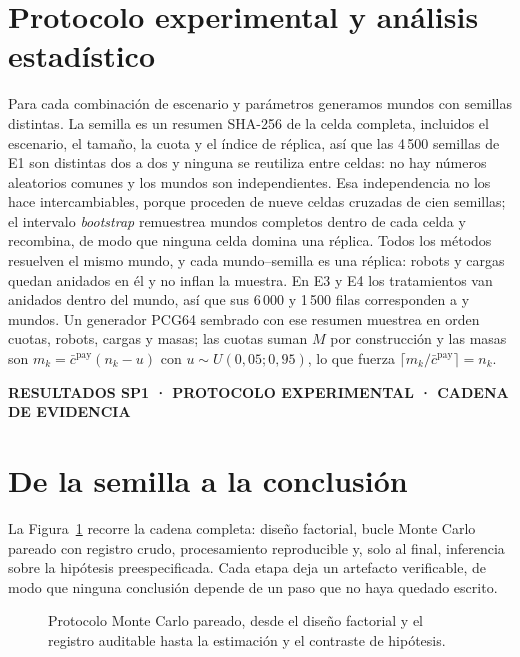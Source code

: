 \documentclass[12pt,a4paper]{article}
\renewcommand{\viuownsource}{%
  \par\vspace{0.8mm}\noindent
  \makebox[\linewidth][c]{\footnotesize\itshape Elaboración propia.}%
  \par
}
\newcommand{\leveltag}[1]{%
  \noindent\colorbox{VIUDark}{%
    \parbox{\dimexpr\textwidth-2\fboxsep\relax}{%
      \color{white}\sffamily\bfseries\small #1%
    }%
  }\par\smallskip
}
\begin{document}
\section*{Protocolo experimental y análisis estadístico}

Para cada combinación de escenario y parámetros generamos mundos con semillas
distintas. La semilla es un resumen SHA-256 de la celda completa, incluidos el
escenario, el tamaño, la cuota y el índice de réplica, así que las 4\,500
semillas de E1 son distintas dos a dos y ninguna se reutiliza entre celdas: no
hay números aleatorios comunes y los mundos son independientes. Esa
independencia no los hace intercambiables, porque proceden de nueve celdas
cruzadas de cien semillas; el intervalo \emph{bootstrap} remuestrea mundos
completos dentro de cada celda y recombina, de modo que ninguna celda domina
una réplica. Todos los métodos resuelven el mismo mundo, y cada mundo--semilla
es una réplica: robots y cargas quedan anidados en él y no inflan la muestra.
En E3 y E4 los tratamientos van anidados dentro del mundo, así que sus 6\,000 y
1\,500 filas corresponden a \NOneFailureWorlds{} y \NOneHeteroWorlds{} mundos.
Un generador PCG64 sembrado con ese resumen muestrea en orden cuotas, robots,
cargas y masas; las cuotas suman $M$ por construcción y las masas son
$m_k=\bar c^{\mathrm{pay}}(n_k-u)$ con $u\sim U(0{,}05;0{,}95)$, lo que fuerza
$\lceil m_k/\bar c^{\mathrm{pay}}\rceil=n_k$.

\clearpage

\leveltag{RESULTADOS SP1 · PROTOCOLO EXPERIMENTAL · CADENA DE EVIDENCIA}
\section*{De la semilla a la conclusión}

La Figura~\ref{fig:sp1-common-metrics} recorre la cadena completa: diseño
factorial, bucle Monte Carlo pareado con registro crudo, procesamiento
reproducible y, solo al final, inferencia sobre la hipótesis preespecificada.
Cada etapa deja un artefacto verificable, de modo que ninguna conclusión
depende de un paso que no haya quedado escrito.

\begin{figure}[H]
\centering
\begingroup
{}
\scalebox{0.99}{}
\endgroup
  \caption{Protocolo Monte Carlo pareado, desde el diseño factorial y el
    registro auditable hasta la estimación y el contraste de hipótesis.}
\label{fig:sp1-common-metrics}
\viuownsource
\end{figure}
\end{document}

